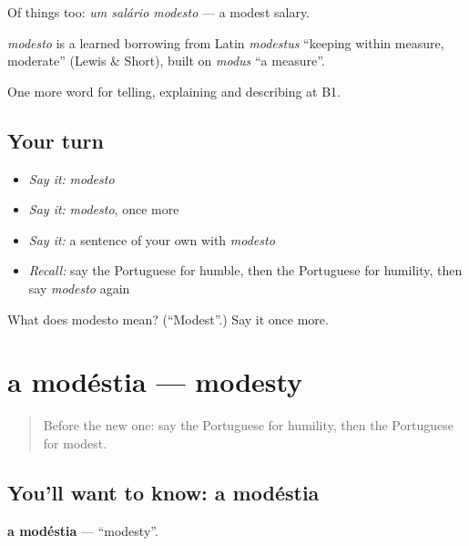Of things too: \emph{um salário modesto} — a modest salary.

\begin{cousinweb}
\emph{modesto} is a learned borrowing from Latin \emph{modestus} \textquotedblleft{}keeping within measure, moderate\textquotedblright{} (Lewis \& Short), built on \emph{modus} \textquotedblleft{}a measure\textquotedblright{}.
\end{cousinweb}

\begin{grammarlens}[title={What you've built}]
One more word for telling, explaining and describing at B1.
\end{grammarlens}

\subsection*{Your turn}
\begin{itemize}
\raggedright
  \item \emph{Say it:} \emph{modesto}
  \item \emph{Say it:} \emph{modesto}, once more
  \item \emph{Say it:} a sentence of your own with \emph{modesto}
  \item \emph{Recall:} say the Portuguese for humble, then the Portuguese for humility, then say \emph{modesto} again
\end{itemize}

\begin{tcolorbox}[breakable,colback=teal!4,colframe=teal!35!black,title={Before you move on}]
What does modesto mean? (\textquotedblleft{}Modest\textquotedblright{}.) Say it once more.
\end{tcolorbox}
\section[a modéstia]{a modéstia — modesty}

\label{lesson:PT-C470-modestia}



\begin{quote}
Before the new one: say the Portuguese for humility, then the Portuguese for modest.
\end{quote}

\subsection*{You'll want to know: a modéstia}
\textbf{a modéstia} — \textquotedblleft{}modesty\textquotedblright{}.

